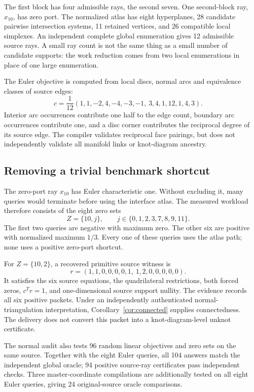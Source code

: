 The first block has four admissible rays, the second seven. One second-block ray, $x_{10}$, has zero port. The normalized atlas has eight hyperplanes, 28 candidate pairwise intersection systems, 11 retained vertices, and 26 compatible local simplexes. An independent complete global enumeration gives 12 admissible source rays. A small ray count is not the same thing as a small number of candidate supports: the work reduction comes from two local enumerations in place of one large enumeration.

The Euler objective is computed from local discs, normal arcs and equivalence classes of source edges:
\begin{equation}
 c=\frac1{12}(1,1,-2,4,-4,-3,-1,\ 3,4,1,12,1,4,3).
 \label{eq:fixture-euler}
\end{equation}
Interior arc occurrences contribute one half to the edge count, boundary arc occurrences contribute one, and a disc corner contributes the reciprocal degree of its source edge. The compiler validates reciprocal face pairings, but does not independently validate all manifold links or knot-diagram ancestry.

\subsection{Removing a trivial benchmark shortcut}
The zero-port ray $x_{10}$ has Euler characteristic one. Without excluding it, many queries would terminate before using the interface atlas. The measured workload therefore consists of the eight zero sets
\[
 Z=\{10,j\},\qquad j\in\{0,1,2,3,7,8,9,11\}.
\]
The first two queries are negative with maximum zero. The other six are positive with normalized maximum $1/3$. Every one of these queries uses the atlas path; none uses a positive zero-port shortcut.

For $Z=\{10,2\}$, a recovered primitive source witness is
\[
 r=(1,1,0,0,0,0,1,\ 1,2,0,0,0,0,0).
\]
It satisfies the six source equations, the quadrilateral restrictions, both forced zeros, $c^Tr=1$, and one-dimensional source support nullity. The evidence records all six positive packets. Under an independently authenticated normal-triangulation interpretation, Corollary~\ref{cor:connected} supplies connectedness. The delivery does not convert this packet into a knot-diagram-level unknot certificate.

The normal audit also tests 96 random linear objectives and zero sets on the same source. Together with the eight Euler queries, all 104 answers match the independent global oracle; 94 positive source-ray certificates pass independent checks. Three master-coordinate compilations are additionally tested on all eight Euler queries, giving 24 original-source oracle comparisons.

